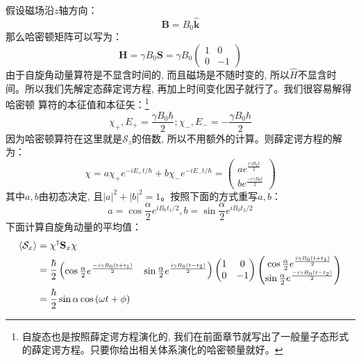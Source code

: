 \documentclass[a4paper,zihao=-4,linespread=1]{ctexrep}
\begin{document}
    假设磁场沿$z$轴方向：\[\mathbf{B}=B_0\hat{\mathbf{k}}\]
    那么哈密顿矩阵可以写为：
    \begin{equation}
        \mathbf{H}=\gamma B_0 \mathbf{S}=\gamma B_0 \begin{pmatrix}
            1&0\\
            0&-1
        \end{pmatrix}
    \end{equation}
    由于自旋角动量算符是不显含时间的, 而且磁场是不随时变的, 所以$\hat{H}$不显含时间。所以我们先解定态薛定谔方程, 再加上时间变化因子就行了。我们很容易解得哈密顿
    算符的本征值和本征矢：\footnote{自旋态也是按照薛定谔方程演化的, 我们在前面章节就写出了一般量子态形式的薛定谔方程。只要你给出相关体系演化的哈密顿量就好。}
    \begin{equation}
        \chi_+,E_+=\frac{\gamma B_0\hbar}{2};\chi_-,E_-=-\frac{\gamma B_0\hbar}{2}
    \end{equation}
    因为哈密顿算符在这里就是$\mathcal{S}_z$的倍数, 所以不用额外的计算。则薛定谔方程的解为：
    \begin{equation}
        \chi = a \chi_+ e^{-iE_+t/\hbar}+b \chi_- e^{-iE_-t/\hbar}=\begin{pmatrix}
            a e^\frac{i\gamma B_0t}{2}\\
            b e^\frac{-i\gamma B_0t}{2}
        \end{pmatrix}
    \end{equation}
    其中$a,b$由初态决定, 且$|a|^2+|b|^2=1$。按照下面的方式重写$a,b$：
    \begin{equation}
        a=\cos\frac{\alpha}{2}e^{iB_0 t_1/2}, b=\sin\frac{\alpha}{2}e^{iB_0 t_2/2}
    \end{equation}
    下面计算自旋角动量的平均值：
    \begin{align}
        \braket{\mathcal{S}_x}&=\chi^\dagger\mathbf{S}_x\chi\\
        &=\frac{\hbar}{2}\begin{pmatrix}
            \cos\frac{\alpha}{2}e^\frac{-i\gamma B_0 (t+t_1)}{2}&\sin\frac{\alpha}{2}e^\frac{i\gamma B_0 (t-t_2)}{2}
        \end{pmatrix}\begin{pmatrix}
            1&0\\
            0&-1
        \end{pmatrix}\begin{pmatrix}
            \cos\frac{\alpha}{2}e^\frac{i\gamma B_0 (t+t_1)}{2}\\\sin\frac{\alpha}{2}e^\frac{-i\gamma B_0 (t-t_2)}{2}
        \end{pmatrix}\\
        &=\frac{\hbar}{2}\sin\alpha\cos\left(\omega t+\phi\right)
    \end{align}
\end{document}

